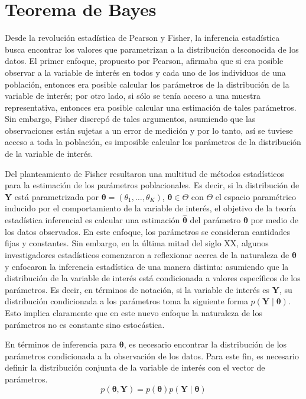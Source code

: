 \documentclass[
  spanish,
  letter]{book}
\theoremstyle{definition}
\theoremstyle{definition}
\theoremstyle{definition}
\theoremstyle{remark}
\begin{document}
\hypertarget{teorema-de-bayes}{%
\section{Teorema de Bayes}\label{teorema-de-bayes}}

Desde la revolución estadística de Pearson y Fisher, la inferencia estadística busca encontrar los valores que parametrizan a la distribución desconocida de los datos. El primer enfoque, propuesto por Pearson, afirmaba que si era posible observar a la variable de interés en todos y cada uno de los individuos de una población, entonces era posible calcular los parámetros de la distribución de la variable de interés; por otro lado, si sólo se tenía acceso a una muestra representativa, entonces era posible calcular una estimación de tales parámetros. Sin embargo, Fisher discrepó de tales argumentos, asumiendo que las observaciones están sujetas a un error de medición y por lo tanto, así se tuviese acceso a toda la población, es imposible calcular los parámetros de la distribución de la variable de interés.

Del planteamiento de Fisher resultaron una multitud de métodos estadísticos para la estimación de los parámetros poblacionales. Es decir, si la distribución de \(\mathbf{Y}\) está parametrizada por \(\boldsymbol \theta=(\theta_1,\ldots,\theta_K)\), \(\boldsymbol \theta\in \Theta\) con \(\Theta\) el espacio paramétrico inducido por el comportamiento de la variable de interés, el objetivo de la teoría estadística inferencial es calcular una estimación \(\hat{\boldsymbol \theta}\) del parámetro \(\boldsymbol \theta\) por medio de los datos observados. En este enfoque, los parámetros se consideran cantidades fijas y constantes. Sin embargo, en la última mitad del siglo XX, algunos investigadores estadísticos comenzaron a reflexionar acerca de la naturaleza de \(\boldsymbol \theta\) y enfocaron la inferencia estadística de una manera distinta: asumiendo que la distribución de la variable de interés está condicionada a valores específicos de los parámetros. Es decir, en términos de notación, si la variable de interés es \(\mathbf{Y}\), su distribución condicionada a los parámetros toma la siguiente forma \(p(\mathbf{Y} \mid \boldsymbol \theta)\). Esto implica claramente que en este nuevo enfoque la naturaleza de los parámetros no es constante sino estocástica.

En términos de inferencia para \(\boldsymbol \theta\), es necesario encontrar la distribución de los parámetros condicionada a la observación de los datos. Para este fin, es necesario definir la distribución conjunta de la variable de interés con el vector de parámetros.
\begin{equation*}
p(\boldsymbol \theta,\mathbf{Y})=p(\boldsymbol \theta)p(\mathbf{Y} \mid \boldsymbol \theta)
\end{equation*}
\end{document}
